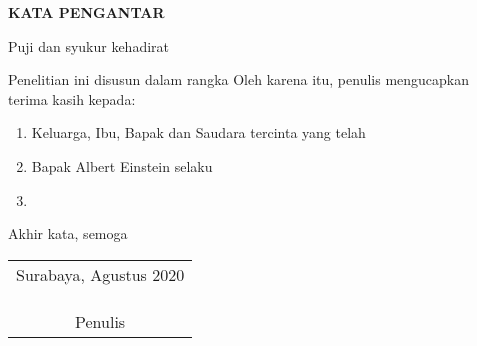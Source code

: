 \begin{center}
  \Large\textbf{KATA PENGANTAR}
\end{center}
\vspace{1ex}

\setlength{\parindent}{7ex} Puji dan syukur kehadirat \lipsum[1][1-5]
\vspace{0.5ex}

Penelitian ini disusun dalam rangka \lipsum[1][1-5]
Oleh karena itu, penulis mengucapkan terima kasih kepada:
\vspace{0.5ex}

\begin{enumerate}[nolistsep]
  \item Keluarga, Ibu, Bapak dan Saudara tercinta yang telah \lipsum[1][1]
  \vspace{0.5ex}
  \item Bapak Albert Einstein selaku \lipsum[1][1-2]
  \vspace{0.5ex}
  \item \lipsum[1][1-3]
  \vspace{0.5ex}
\end{enumerate}
\vspace{0.5ex}

Akhir kata, semoga \lipsum[1][1-5]
\vspace{2ex}

\begin{flushright}
  \begin{tabular}[b]{c}
    Surabaya, Agustus 2020
    \\
    \\
    \\
    \\
    Penulis
  \end{tabular}
\end{flushright}